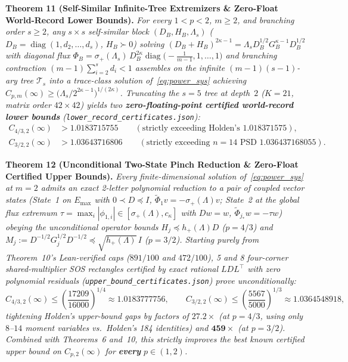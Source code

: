 \documentclass[10pt,letterpaper]{article}
\newcommand{\diag}{\operatorname{diag}}
\begin{document}
\begin{tcolorbox}[mathbox]
\textbf{Theorem 11 (Self-Similar Infinite-Tree Extremizers \& Zero-Float World-Record Lower Bounds).}
\emph{For every $1 < p < 2$, $m \ge 2$, and branching order $s \ge 2$, any $s \times s$ self-similar block $(D_B, H_B, \Lambda_s)$ ($D_B = \diag(1, d_2,\dots,d_s)$, $H_B \succ 0$) solving $(D_B+H_B)^{2\kappa-1} = \Lambda_s D_B^{1/2} G_B^{\kappa-1} D_B^{1/2}$ with diagonal flux $\Phi_B = \sigma_+(\Lambda_s)\,D_B^{2\kappa}\diag\bigl(-\frac{1}{m-1}, 1, \dots, 1\bigr)$ and branching contraction $(m-1)\sum_{i=2}^s d_i < 1$ assembles on the infinite $(m-1)(s-1)$-ary tree $\mathcal{T}_s$ into a trace-class solution of~\eqref{eq:power_sys} achieving $C_{p,m}(\infty) \ge \bigl(\Lambda_s / 2^{2\kappa-1}\bigr)^{1/(2\kappa)}$. Truncating the $s = 5$ tree at depth~$2$ ($K = 21$, matrix order $42\times 42$) yields two \textbf{zero-floating-point certified world-record lower bounds} (\texttt{lower\_record\_certificates.json}):}
\begin{align*}
  C_{4/3,2}(\infty) &> 1.0183715755 \qquad (\text{strictly exceeding Holden's } 1.018371575), \\
  C_{3/2,2}(\infty) &> 1.03643716806 \qquad (\text{strictly exceeding } n = 14 \text{ PSD } 1.036437168055).
\end{align*}
\end{tcolorbox}

\begin{tcolorbox}[mathbox]
\textbf{Theorem 12 (Unconditional Two-State Pinch Reduction \& Zero-Float Certified Upper Bounds).}
\emph{Every finite-dimensional solution of~\eqref{eq:power_sys} at $m = 2$ admits an exact 2-letter polynomial reduction to a pair of coupled vector states (State~1 on $E_{\max}$ with $0 \prec D \preceq I$, $\widetilde{\Phi}_1 v = -\sigma_+(\Lambda) v$; State~2 at the global flux extremum $\tau = \max_i|\phi_{1,i}| \in [\sigma_+(\Lambda), c_\kappa]$ with $D w = w$, $\widetilde{\Phi}_{j_*} w = -\tau w$) obeying the unconditional operator bounds $H_j \preceq h_+(\Lambda) D$ ($p = 4/3$) and $M_j := D^{-1/2}G_j^{1/2}D^{-1/2} \preceq \sqrt{h_+(\Lambda)}\,I$ ($p = 3/2$). Starting purely from Theorem~10's Lean-verified caps ($891/100$ and $472/100$), 5 and 8 four-corner shared-multiplier SOS rectangles certified by exact rational $LDL^\top$ with zero polynomial residuals (\texttt{upper\_bound\_certificates.json}) prove unconditionally:}
\[
  C_{4/3,2}(\infty) \le \left(\frac{17209}{16000}\right)^{1/4} \approx 1.0183777756,
  \qquad
  C_{3/2,2}(\infty) \le \left(\frac{5567}{5000}\right)^{1/3} \approx 1.0364548918,
\]
\emph{tightening Holden's upper-bound gaps by factors of $\mathbf{27.2\times}$ (at $p = 4/3$, using only $8$--$14$ moment variables vs.\ Holden's 184 identities) and $\mathbf{459\times}$ (at $p = 3/2$). Combined with Theorems~6 and~10, this strictly improves the best known certified upper bound on $C_{p,2}(\infty)$ for \textbf{every} $p \in (1, 2)$.}
\end{tcolorbox}
\end{document}
